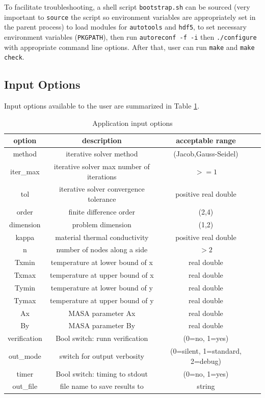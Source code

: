 \documentclass[letterpaper,12pt]{article}
\begin{document}
To facilitate troubleshooting, a shell script \verb|bootstrap.sh| can be sourced (very important to \verb|source| the script so environment variables are appropriately set in the parent process) to load modules for \verb|autotools| and \verb|hdf5|, to set necessary environment variables (\verb|PKGPATH|), then run \verb|autoreconf -f -i| then \verb|./configure| with appropriate command line options. After that, user can run \verb|make| and \verb|make check|.

\subsection{Input Options}
Input options available to the user are summarized in Table \ref{tab:input}.

\begin{table}[h]
\label{tab:input}
\caption{Application input options}
\begin{center}
\begin{tabular}{| c | c | c | c | }
\hline
option & description & acceptable range  \\ \hline \hline
method & iterative solver method & (Jacob,Gauss-Seidel)  \\ \hline
iter\_max & iterative solver max number of iterations & $>=1$ \\ \hline
tol & iterative solver convergence tolerance & positive real double  \\ \hline
order & finite difference order & (2,4)  \\ \hline
dimension & problem dimension & (1,2)   \\ \hline
kappa & material thermal conductivity & positive real double  \\ \hline
n & number of nodes along a side & $>2$  \\ \hline
Txmin & temperature at lower bound of x & real double  \\ \hline
Txmax & temperature at upper bound of x & real double  \\ \hline
Tymin & temperature at lower bound of y & real double  \\ \hline
Tymax & temperature at upper bound of y & real double  \\ \hline
Ax & MASA parameter Ax & real double  \\ \hline
By & MASA parameter By & real double  \\ \hline
verification & Bool switch: runn verification & (0=no, 1=yes)  \\ \hline
out\_mode & switch for output verbosity & (0=silent, 1=standard, 2=debug)  \\ \hline
timer & Bool switch: timing to stdout & (0=no, 1=yes)  \\ \hline
out\_file & file name to save results to & string  \\ \hline
\end{tabular}
\end{center}
\end{table}
\end{document}
